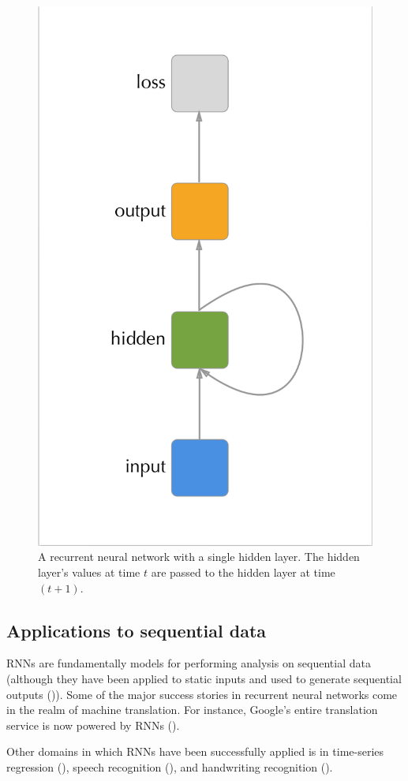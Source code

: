 \documentclass[]{book}
\theoremstyle{definition}
\theoremstyle{definition}
\theoremstyle{definition}
\theoremstyle{remark}
\begin{document}
\begin{figure}

{\centering \includegraphics[width=0.4\linewidth]{figures/rnn_compact} 

}

\caption{A recurrent neural network with a single hidden layer. The hidden layer's values at time $t$ are passed to the hidden layer at time $(t + 1)$.}\label{fig:cyclegraph}
\end{figure}

\subsection{Applications to sequential
data}\label{applications-to-sequential-data}

RNNs are fundamentally models for performing analysis on sequential data
(although they have been applied to static inputs and used to generate
sequential outputs (\citet{rnn_captions})). Some of the major success
stories in recurrent neural networks come in the realm of machine
translation. For instance, Google's entire translation service is now
powered by RNNs (\citet{google_translate}).

Other domains in which RNNs have been successfully applied is in
time-series regression (\citet{rnn_regression}), speech recognition
(\citet{rnn_speach}), and handwriting recognition
(\citet{rnn_handwriting}).
\end{document}
